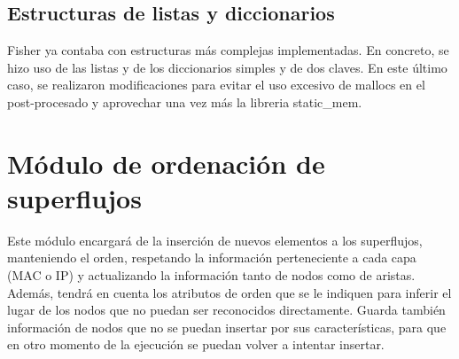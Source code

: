 \documentclass[twoside, 12pt]{epstfg}
\begin{document}
\subsection{Estructuras de listas y diccionarios}
Fisher ya contaba con estructuras más complejas implementadas. En concreto, se hizo uso de las listas y de los diccionarios simples y de dos claves. En este último caso, se realizaron modificaciones para evitar el uso excesivo de mallocs en el post-procesado y aprovechar una vez más la libreria static\_mem.

\section{Módulo de ordenación de superflujos}

Este módulo encargará de la inserción de nuevos elementos a los superflujos, manteniendo el orden, respetando la información perteneciente a cada capa (MAC o IP) y actualizando la información tanto de nodos como de aristas. Además, tendrá en cuenta los atributos de orden que se le indiquen para inferir el lugar de los nodos que no puedan ser reconocidos directamente. Guarda también información de nodos que no se puedan insertar por sus características, para que en otro momento de la ejecución se puedan volver a intentar insertar.
\end{document}
